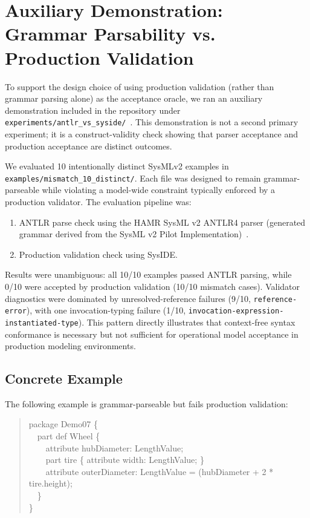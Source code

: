 \section{Auxiliary Demonstration: Grammar Parsability vs. Production Validation}
\label{appendix:antlr_vs_syside}

To support the design choice of using production validation (rather than grammar parsing alone) as the acceptance oracle, we ran an auxiliary demonstration included in the repository under \texttt{experiments/antlr\_vs\_syside/}~\cite{antlrVsSysideDemo2026}. This demonstration is not a second primary experiment; it is a construct-validity check showing that parser acceptance and production acceptance are distinct outcomes.

We evaluated 10 intentionally distinct SysMLv2 examples in \texttt{examples/mismatch\_10\_distinct/}. Each file was designed to remain grammar-parseable while violating a model-wide constraint typically enforced by a production validator. The evaluation pipeline was:
\begin{enumerate}
    \item ANTLR parse check using the HAMR SysML v2 ANTLR4 parser (generated grammar derived from the SysML v2 Pilot Implementation)~\cite{hamrSysmlParser2026,sysmlV2PilotImplementation2026}.
    \item Production validation check using SysIDE.
\end{enumerate}

Results were unambiguous: all 10/10 examples passed ANTLR parsing, while 0/10 were accepted by production validation (10/10 mismatch cases). Validator diagnostics were dominated by unresolved-reference failures (9/10, \texttt{reference-error}), with one invocation-typing failure (1/10, \texttt{invocation-expression-instantiated-type}). This pattern directly illustrates that context-free syntax conformance is necessary but not sufficient for operational model acceptance in production modeling environments.

\subsection*{Concrete Example}
The following example is grammar-parseable but fails production validation:
\begin{quote}
\small\ttfamily
package Demo07 \{\\
\ \ part def Wheel \{\\
\ \ \ \ attribute hubDiameter: LengthValue;\\
\ \ \ \ part tire \{ attribute width: LengthValue; \}\\
\ \ \ \ attribute outerDiameter: LengthValue = (hubDiameter + 2 * tire.height);\\
\ \ \}\\
\}
\end{quote}

